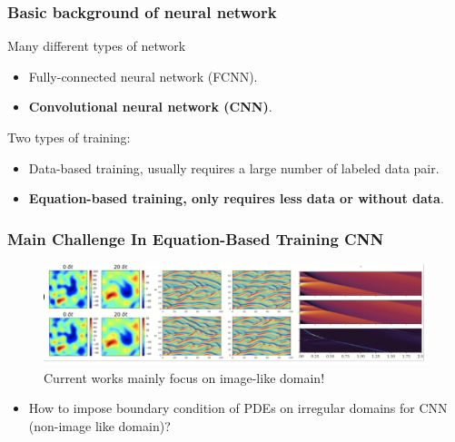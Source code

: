 \documentclass{beamer}
\begin{document}
\begin{frame}
\frametitle{Basic background of neural network}
Many different types of network
\begin{itemize}
\item Fully-connected neural network (FCNN).
\item \textbf{Convolutional neural network (CNN)}.
\end{itemize}
Two types of training:
\begin{itemize}
    \item Data-based training, usually requires a large number of labeled data pair.
    \item \textbf{Equation-based training, only requires less data or without data}.
\end{itemize}
\end{frame}

\begin{frame}
\frametitle{Main Challenge In Equation-Based Training CNN}
\begin{figure}
	\includegraphics[width=1\textwidth]{squaredomain.png}
	Current works mainly focus on image-like domain!
\end{figure}
\begin{itemize}
\item How to impose boundary condition of PDEs  on irregular domains for CNN (non-image like domain)?   
\end{itemize}
\end{frame}
\end{document}
